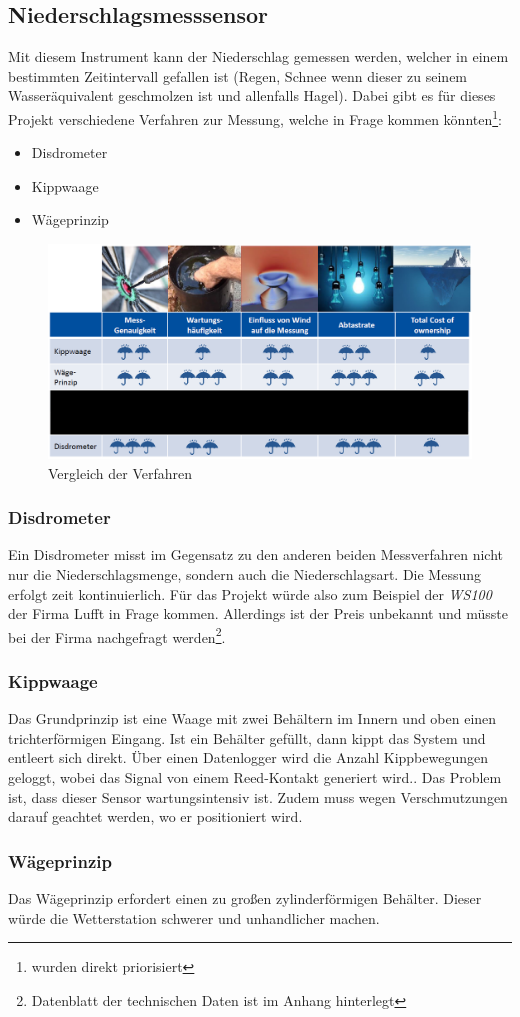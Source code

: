 \subsection{Niederschlagsmesssensor}
Mit diesem Instrument kann der Niederschlag gemessen werden, welcher in einem bestimmten Zeitintervall gefallen ist (Regen, Schnee wenn dieser zu seinem Wasseräquivalent geschmolzen ist und allenfalls Hagel). Dabei gibt es für dieses Projekt verschiedene Verfahren zur Messung, welche in Frage kommen könnten\footnote{wurden direkt priorisiert}:
\begin{itemize}
\item[1.] Disdrometer
\item[2.] Kippwaage
\item[3.] Wägeprinzip
\end{itemize}
\begin{figure}[hbtp]
\centering
\includegraphics[width=\textwidth]{graphics/vergleich_verfahren.PNG}
\caption{Vergleich der Verfahren}
\label{vergleich_der_verfahren}
\end{figure}

\subsubsection{Disdrometer}
Ein Disdrometer misst im Gegensatz zu den anderen beiden Messverfahren nicht nur die Niederschlagsmenge, sondern auch die Niederschlagsart. Die Messung erfolgt zeit kontinuierlich. Für das Projekt würde also zum Beispiel der \textit{WS100} der Firma Lufft in Frage kommen. Allerdings ist der Preis unbekannt und müsste bei der Firma nachgefragt werden\footnote{Datenblatt der technischen Daten ist im Anhang hinterlegt}.

\subsubsection{Kippwaage}
Das Grundprinzip ist eine Waage mit zwei Behältern im Innern und oben einen trichterförmigen Eingang. Ist ein Behälter gefüllt, dann kippt das System und entleert sich direkt. Über einen Datenlogger wird die Anzahl Kippbewegungen geloggt, wobei das Signal von einem Reed-Kontakt generiert wird.. Das Problem ist, dass dieser Sensor wartungsintensiv ist. Zudem muss wegen Verschmutzungen darauf geachtet werden, wo er positioniert wird.

\subsubsection{Wägeprinzip}
Das Wägeprinzip erfordert einen zu großen zylinderförmigen Behälter. Dieser würde die Wetterstation schwerer und unhandlicher machen.